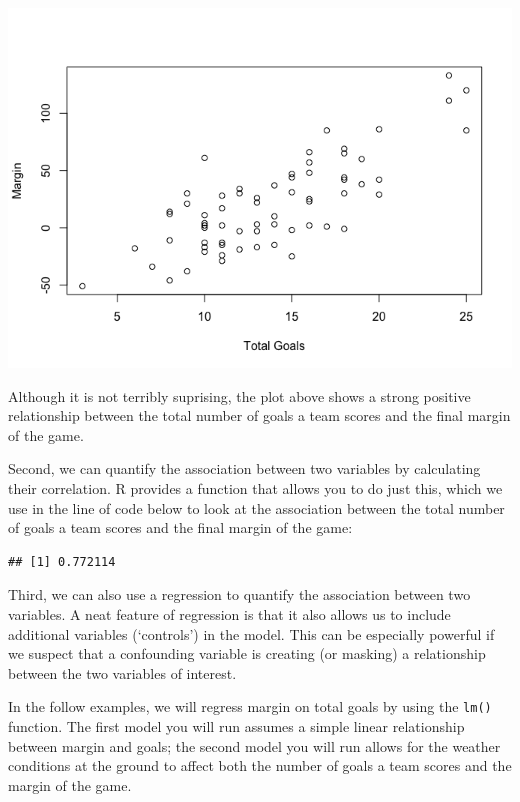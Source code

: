 \documentclass[
]{article}
\newenvironment{Shaded}{\begin{snugshade}}{\end{snugshade}}
\newcommand{\FunctionTok}[1]{\textcolor[rgb]{0.00,0.00,0.00}{#1}}
\newcommand{\NormalTok}[1]{#1}
\newcommand{\SpecialCharTok}[1]{\textcolor[rgb]{0.00,0.00,0.00}{#1}}
\begin{document}
\includegraphics{Preparation_files/figure-gfm/unnamed-chunk-17-1.png}

Although it is not terribly suprising, the plot above shows a strong
positive relationship between the total number of goals a team scores
and the final margin of the game.

Second, we can quantify the association between two variables by
calculating their correlation. R provides a function that allows you to
do just this, which we use in the line of code below to look at the
association between the total number of goals a team scores and the
final margin of the game:

\begin{Shaded}
\end{Shaded}

\begin{verbatim}
## [1] 0.772114
\end{verbatim}

Third, we can also use a regression to quantify the association between
two variables. A neat feature of regression is that it also allows us to
include additional variables (`controls') in the model. This can be
especially powerful if we suspect that a confounding variable is
creating (or masking) a relationship between the two variables of
interest.

In the follow examples, we will regress margin on total goals by using
the \texttt{lm()} function. The first model you will run assumes a
simple linear relationship between margin and goals; the second model
you will run allows for the weather conditions at the ground to affect
both the number of goals a team scores and the margin of the game.
\end{document}
